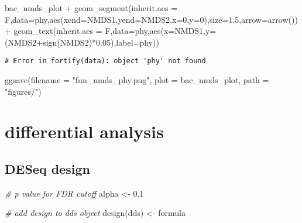 \documentclass[
]{article}
\newenvironment{Shaded}{\begin{snugshade}}{\end{snugshade}}
\newcommand{\AttributeTok}[1]{\textcolor[rgb]{0.77,0.63,0.00}{#1}}
\newcommand{\CommentTok}[1]{\textcolor[rgb]{0.56,0.35,0.01}{\textit{#1}}}
\newcommand{\DecValTok}[1]{\textcolor[rgb]{0.00,0.00,0.81}{#1}}
\newcommand{\FloatTok}[1]{\textcolor[rgb]{0.00,0.00,0.81}{#1}}
\newcommand{\FunctionTok}[1]{\textcolor[rgb]{0.00,0.00,0.00}{#1}}
\newcommand{\NormalTok}[1]{#1}
\newcommand{\OtherTok}[1]{\textcolor[rgb]{0.56,0.35,0.01}{#1}}
\newcommand{\SpecialCharTok}[1]{\textcolor[rgb]{0.00,0.00,0.00}{#1}}
\newcommand{\StringTok}[1]{\textcolor[rgb]{0.31,0.60,0.02}{#1}}
\begin{document}
\begin{Shaded}
\begin{Highlighting}[]
\NormalTok{bac\_nmds\_plot }\SpecialCharTok{+} \FunctionTok{geom\_segment}\NormalTok{(}\AttributeTok{inherit.aes =}\NormalTok{ F,}\AttributeTok{data=}\NormalTok{phy,}\FunctionTok{aes}\NormalTok{(}\AttributeTok{xend=}\NormalTok{NMDS1,}\AttributeTok{yend=}\NormalTok{NMDS2,}\AttributeTok{x=}\DecValTok{0}\NormalTok{,}\AttributeTok{y=}\DecValTok{0}\NormalTok{),}\AttributeTok{size=}\FloatTok{1.5}\NormalTok{,}\AttributeTok{arrow=}\FunctionTok{arrow}\NormalTok{()) }\SpecialCharTok{+} 
  \FunctionTok{geom\_text}\NormalTok{(}\AttributeTok{inherit.aes =}\NormalTok{ F,}\AttributeTok{data=}\NormalTok{phy,}\FunctionTok{aes}\NormalTok{(}\AttributeTok{x=}\NormalTok{NMDS1,}\AttributeTok{y=}\NormalTok{(NMDS2}\SpecialCharTok{+}\FunctionTok{sign}\NormalTok{(NMDS2)}\SpecialCharTok{*}\FloatTok{0.05}\NormalTok{),}\AttributeTok{label=}\NormalTok{phy))}
\end{Highlighting}
\end{Shaded}

\begin{verbatim}
# Error in fortify(data): object 'phy' not found
\end{verbatim}

\begin{Shaded}
\begin{Highlighting}[]
\FunctionTok{ggsave}\NormalTok{(}\AttributeTok{filename =} \StringTok{"fun\_nmds\_phy.png"}\NormalTok{, }\AttributeTok{plot =}\NormalTok{ bac\_nmds\_plot, }\AttributeTok{path =} \StringTok{"figures/"}\NormalTok{)}
\end{Highlighting}
\end{Shaded}

\hypertarget{differential-analysis}{%
\section{differential analysis}\label{differential-analysis}}

\hypertarget{deseq-design}{%
\subsection{DESeq design}\label{deseq-design}}

\begin{Shaded}
\begin{Highlighting}[]
\CommentTok{\# p value for FDR cutoff}
\NormalTok{alpha }\OtherTok{\textless{}{-}} \FloatTok{0.1}

\CommentTok{\# add design to dds object}
\FunctionTok{design}\NormalTok{(dds) }\OtherTok{\textless{}{-}}\NormalTok{ formula}
\end{Highlighting}
\end{Shaded}
\end{document}
